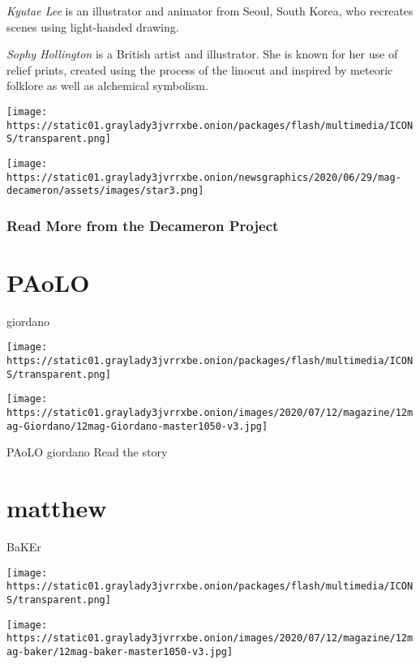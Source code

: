 \emph{Kyutae Lee} is an illustrator and animator from Seoul, South
Korea, who recreates scenes using light-handed drawing.

\emph{Sophy Hollington} is a British artist and illustrator. She is
known for her use of relief prints, created using the process of the
linocut and inspired by meteoric folklore as well as alchemical
symbolism.

\texttt{[image: https://static01.graylady3jvrrxbe.onion/packages/flash/multimedia/ICONS/transparent.png]}

\texttt{[image: https://static01.graylady3jvrrxbe.onion/newsgraphics/2020/06/29/mag-decameron/assets/images/star3.png]}

\hypertarget{read-more-from-the-decameron-project}{%
\subsubsection{Read More from the Decameron
Project}\label{read-more-from-the-decameron-project}}

\href{https://www.nytimes3xbfgragh.onion/interactive/2020/07/07/magazine/Paolo-Giordano-short-story.html}{}

\hypertarget{paolo}{%
\section{PAoLO}\label{paolo}}

giordano

\texttt{[image: https://static01.graylady3jvrrxbe.onion/packages/flash/multimedia/ICONS/transparent.png]}

\texttt{[image: https://static01.graylady3jvrrxbe.onion/images/2020/07/12/magazine/12mag-Giordano/12mag-Giordano-master1050-v3.jpg]}

PAoLO giordano Read the story

\href{https://www.nytimes3xbfgragh.onion/interactive/2020/07/07/magazine/matthew-baker-short-story.html}{}

\hypertarget{matthew}{%
\section{matthew}\label{matthew}}

BaKEr

\texttt{[image: https://static01.graylady3jvrrxbe.onion/packages/flash/multimedia/ICONS/transparent.png]}

\texttt{[image: https://static01.graylady3jvrrxbe.onion/images/2020/07/12/magazine/12mag-baker/12mag-baker-master1050-v3.jpg]}

